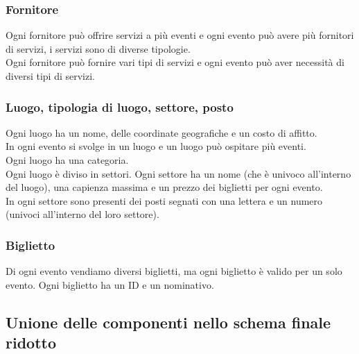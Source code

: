 \documentclass[a4paper,11pt]{article}
\begin{document}

\subsubsection*{Fornitore}

Ogni fornitore può offrire servizi a più eventi e ogni evento può avere più fornitori di servizi, i servizi sono di diverse tipologie.\\
Ogni fornitore può fornire vari tipi di servizi e ogni evento può aver necessità di diversi tipi di servizi.


\subsubsection*{Luogo, tipologia di luogo, settore, posto}

Ogni luogo ha un nome, delle coordinate geografiche e un costo di affitto.\\
In ogni evento si svolge in un luogo e un luogo può ospitare più eventi.\\
Ogni luogo ha una categoria.\\
Ogni luogo è diviso in settori.
Ogni settore ha un nome (che è univoco all'interno del luogo), una capienza massima e un prezzo dei biglietti per ogni evento.\\
In ogni settore sono presenti dei posti segnati con una lettera e un numero (univoci all'interno del loro settore).


\subsubsection*{Biglietto}

Di ogni evento vendiamo diversi biglietti, ma ogni biglietto è valido per un solo evento.
Ogni biglietto ha un ID e un nominativo.


\subsection{Unione delle componenti nello schema finale ridotto}
\end{document}
